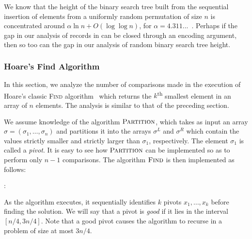 \documentclass{patmorin}
\begin{document}
\begin{rem}
  We know that the height of the binary search tree built from the
  sequential insertion of elements from a uniformly random permutation
  of size $n$ is concentrated around $\alpha \ln n + O(\log \log n)$,
  for $\alpha = 4.311...$~\cite{reed:height}. Perhaps if the gap in
  our analysis of records in  can be closed through an
  encoding argument, then so too can the gap in our analysis of random
  binary search tree height.
\end{rem}

\subsubsection{Hoare's Find Algorithm}

In this section, we analyze the number of comparisons made in the
execution of Hoare's classic \textsc{Find} algorithm~\cite{hoare:find}
which returns the $k$\textsuperscript{th} smallest element in an array
of $n$ elements. The analysis is similar to that of the preceding
section.

We assume knowledge of the algorithm $\textsc{Partition}$, which takes
as input an array $\sigma = (\sigma_1, \dots, \sigma_n)$ and
partitions it into the arrays $\sigma^L$ and $\sigma^R$ which contain
the values strictly smaller and strictly larger than $\sigma_1$,
respectively. The element $\sigma_1$ is called a \emph{pivot}. It is
easy to see how $\textsc{Partition}$ can be implemented so as to
perform only $n - 1$ comparisons. The algorithm $\textsc{Find}$ is
then implemented as follows:

:
\begin{algorithmic}[1]
  \ENDIF
\end{algorithmic}

As the algorithm executes, it sequentially identifies $k$ pivots $x_1,
\dots, x_k$ before finding the solution. We will say that a pivot is
\emph{good} if it lies in the interval $[n/4, 3n/4]$. Note that a good
pivot causes the algorithm to recurse in a problem of size at most
$3n/4$.
\end{document}
